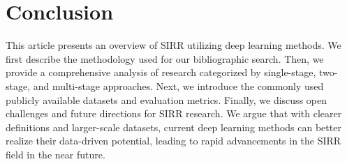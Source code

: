 \section{Conclusion}
\label{sec:conclusion}
This article presents an overview of SIRR utilizing deep learning methods. We first describe the methodology used for our bibliographic search. Then, we provide a comprehensive analysis of research categorized by single-stage, two-stage, and multi-stage approaches. Next, we introduce the commonly used publicly available datasets and evaluation metrics. Finally, we discuss open challenges and future directions for SIRR research. We argue that with clearer definitions and larger-scale datasets, current deep learning methods can better realize their data-driven potential, leading to rapid advancements in the SIRR field in the near future.